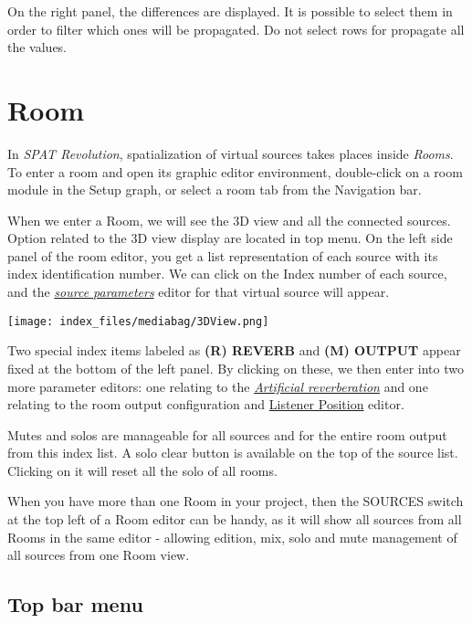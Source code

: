 \documentclass[
  letterpaper,
  DIV=11,
  numbers=noendperiod]{scrreport}
\begin{document}
On the right panel, the differences are displayed. It is possible to
select them in order to filter which ones will be propagated. Do not
select rows for propagate all the values.

\hypertarget{room}{%
\chapter{Room}\label{room}}

In \emph{SPAT Revolution}, spatialization of virtual sources takes
places inside \emph{Rooms}. To enter a room and open its graphic editor
environment, double-click on a room module in the Setup graph, or select
a room tab from the Navigation bar.

When we enter a Room, we will see the 3D view and all the connected
sources. Option related to the 3D view display are located in top menu.
On the left side panel of the room editor, you get a list representation
of each source with its index identification number. We can click on the
Index number of each source, and the
\emph{\href{Spat_Environment_Source?id=source-parameters.md}{source
parameters}} editor for that virtual source will appear.

\texttt{[image: index\_files/mediabag/3DView.png]}

Two special index items labeled as \textbf{(R) REVERB} and \textbf{(M)
OUTPUT} appear fixed at the bottom of the left panel. By clicking on
these, we then enter into two more parameter editors: one relating to
the \emph{\href{Spat_Environment_Artificial_Reverberation.md}{Artificial
reverberation}} and one relating to the room output configuration and
\href{Spatialisation_Technology_Listener_Position.md}{Listener Position}
editor.

Mutes and solos are manageable for all sources and for the entire room
output from this index list. A solo clear button is available on the top
of the source list. Clicking on it will reset all the solo of all rooms.

When you have more than one Room in your project, then the SOURCES
switch at the top left of a Room editor can be handy, as it will show
all sources from all Rooms in the same editor - allowing edition, mix,
solo and mute management of all sources from one Room view.

\hypertarget{top-bar-menu}{%
\section{Top bar menu}\label{top-bar-menu}}
\end{document}
